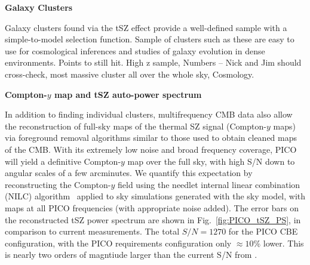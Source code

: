 \documentclass[PICOReport.tex]{subfiles}
\begin{document}
{\bf Galaxy Clusters}


Galaxy clusters found via the tSZ  effect provide a well-defined sample with a simple-to-model selection function. Sample of clusters such as these are easy to use for cosmological inferences and studies of galaxy evolution in dense environments. 
Points to still hit.
High z sample,
Numbers -- Nick and Jim should cross-check,
most massive cluster all over the whole sky,
Cosmology.

{\bf Compton-$y$ map and tSZ auto-power spectrum}

In addition to finding individual clusters, multifrequency CMB data also allow the reconstruction of full-sky maps of the thermal SZ signal (Compton-$y$ maps) via foreground removal algorithms similar to those used to obtain cleaned maps of the CMB.  With its extremely low noise and broad frequency coverage, PICO will yield a definitive Compton-$y$ map over the full sky, with high S/N down to angular scales of a few arcminutes.  We quantify this expectation by reconstructing the Compton-$y$ field using the needlet internal linear combination (NILC) algorithm~\cite{Delabrouille2009} applied to sky simulations generated with the \planck sky model, with maps at all PICO frequencies (with appropriate noise added).  The error bars on the reconstructed tSZ power spectrum are shown in Fig.~\ref{fig:PICO_tSZ_PS}, in comparison to current measurements.  The total $S/N = 1270$ for the PICO CBE configuration, with the PICO requirements configuration only $\approx 10$\% lower.  This is nearly two orders of magntiude larger than the current S/N from \planck.
\end{document}
